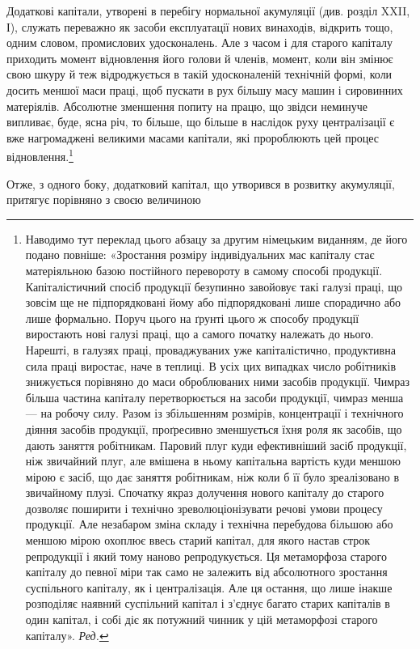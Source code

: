 Додаткові капітали, утворені в перебігу нормальної акумуляції
(див. розділ XXII, І), служать переважно як засоби
експлуатації нових винаходів, відкрить тощо, одним словом,
промислових удосконалень. Але з часом і для старого капіталу
приходить момент відновлення його голови й членів, момент,
коли він змінює свою шкуру й теж відроджується в такій удосконаленій
технічній формі, коли досить меншої маси праці,
щоб пускати в рух більшу масу машин і сировинних матеріялів.
Абсолютне зменшення попиту на працю, що звідси неминуче
випливає, буде, ясна річ, то більше, що більше в наслідок руху
централізації є вже нагромаджені великими масами капітали,
які пророблюють цей процес відновлення.\footnote*{
Наводимо тут переклад цього абзацу за другим німецьким виданням,
де його подано повніше: «Зростання розміру індивідуальних мас
капіталу стає матеріяльною базою постійного перевороту в самому способі
продукції. Капіталістичний спосіб продукції безупинно завойовує
такі галузі праці, що зовсім ще не підпорядковані йому або підпорядковані
лише спорадично або лише формально. Поруч цього на ґрунті
цього ж способу продукції виростають нові галузі праці, що а самого початку
належать до нього. Нарешті, в галузях праці, проваджуваних
уже капіталістично, продуктивна сила праці виростає, наче в теплиці.
В усіх цих випадках число робітників знижується порівняно до маси
оброблюваних ними засобів продукції. Чимраз більша частина капіталу
перетворюється на засоби продукції, чимраз менша — на робочу силу.
Разом із збільшенням розмірів, концентрації і технічного діяння
засобів продукції, проґресивно зменшується їхня роля як засобів, що
дають заняття робітникам. Паровий плуг куди ефективніший засіб продукції,
ніж звичайний плуг, але вмішена в ньому капітальна вартість
куди меншою мірою є засіб, що дає заняття робітникам, ніж коли б її
було зреалізовано в звичайному плузі. Спочатку якраз долучення нового
капіталу до старого дозволяє поширити і технічно зреволюціонізувати
речові умови процесу продукції. Але незабаром зміна складу і технічна
перебудова більшою або меншою мірою охоплює ввесь старий капітал,
для якого настав строк репродукції і який тому наново репродукується.
Ця метаморфоза старого капіталу до певної міри так само не залежить від
абсолютного зростання суспільного капіталу, як і централізація. Але ця
остання, що лише інакше розподіляє наявний суспільний капітал і з’єднує
багато старих капіталів в один капітал, і собі діє як потужний чинник
у цій метаморфозі старого капіталу». \emph{Ред.}
}

Отже, з одного боку, додатковий капітал, що утворився в
розвитку акумуляції, притягує порівняно з своєю величиною
\parbreak{}  %
